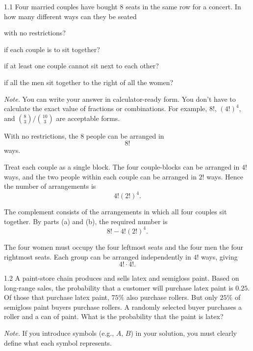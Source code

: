 \documentclass[11pt,oneside]{article}
\begin{document}

\begin{problem}{1.1}
Four married couples have bought 8 seats in the same row for a concert. In how many different ways can they be seated
\begin{problemsubparts}
    \item with no restrictions?
    \item if each couple is to sit together?
    \item if at least one couple cannot sit next to each other?
    \item if all the men sit together to the right of all the women?
\end{problemsubparts}

\textit{Note.} You can write your answer in calculator-ready form. You don't have to calculate the exact value of fractions or combinations. For example, $8!$, $(4!)^4$, and $\displaystyle \binom{8}{3}/\binom{10}{3}$ are acceptable forms.
\end{problem}

\begin{solution}
\begin{problemsubparts}
    \item With no restrictions, the 8 people can be arranged in
    \[
        \boxed{8!}
    \]
    ways.

    \item Treat each couple as a single block. The four couple-blocks can be arranged in $4!$ ways, and the two people within each couple can be arranged in $2!$ ways. Hence the number of arrangements is
    \[
        \boxed{4!(2!)^4}.
    \]

    \item The complement consists of the arrangements in which all four couples sit together. By parts (a) and (b), the required number is
    \[
        \boxed{8!-4!(2!)^4}.
    \]

    \item The four women must occupy the four leftmost seats and the four men the four rightmost seats. Each group can be arranged independently in $4!$ ways, giving
    \[
        \boxed{4!\cdot4!}.
    \]
\end{problemsubparts}
\end{solution}

\begin{problem}{1.2}
A paint-store chain produces and sells latex and semigloss paint. Based on long-range sales, the probability that a customer will purchase latex paint is $0.25$. Of those that purchase latex paint, $75\%$ also purchase rollers. But only $25\%$ of semigloss paint buyers purchase rollers. A randomly selected buyer purchases a roller and a can of paint. What is the probability that the paint is latex?

\textit{Note.} If you introduce symbols (e.g., $A$, $B$) in your solution, you must clearly define what each symbol represents.
\end{problem}
\end{document}
